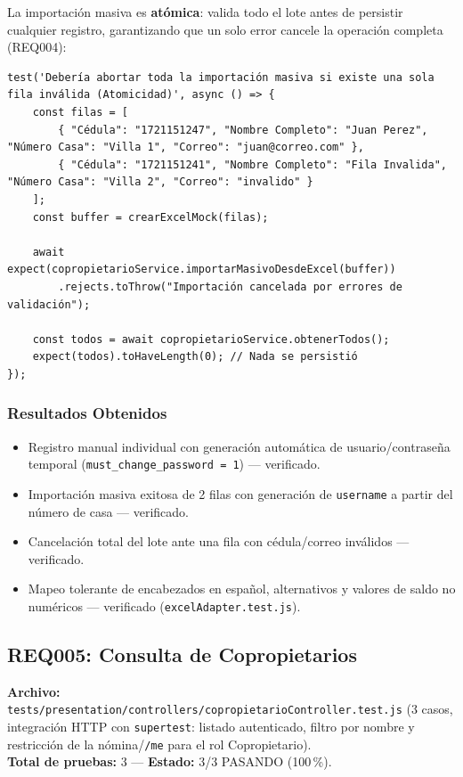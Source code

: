 \documentclass[12pt,a4paper]{article}
\begin{document}
La importación masiva es \textbf{atómica}: valida todo el lote antes de persistir cualquier
registro, garantizando que un solo error cancele la operación completa (REQ004):

\begin{lstlisting}[caption={Prueba de atomicidad de la importación masiva (\texttt{CopropietarioService.test.js})}]
test('Debería abortar toda la importación masiva si existe una sola fila inválida (Atomicidad)', async () => {
    const filas = [
        { "Cédula": "1721151247", "Nombre Completo": "Juan Perez", "Número Casa": "Villa 1", "Correo": "juan@correo.com" },
        { "Cédula": "1721151241", "Nombre Completo": "Fila Invalida", "Número Casa": "Villa 2", "Correo": "invalido" }
    ];
    const buffer = crearExcelMock(filas);

    await expect(copropietarioService.importarMasivoDesdeExcel(buffer))
        .rejects.toThrow("Importación cancelada por errores de validación");

    const todos = await copropietarioService.obtenerTodos();
    expect(todos).toHaveLength(0); // Nada se persistió
});
\end{lstlisting}

\subsubsection*{Resultados Obtenidos}
\begin{itemize}[nosep]
    \item Registro manual individual con generación automática de usuario/contraseña
    temporal (\texttt{must\_change\_password = 1}) — verificado.
    \item Importación masiva exitosa de 2 filas con generación de \texttt{username} a
    partir del número de casa — verificado.
    \item Cancelación total del lote ante una fila con cédula/correo inválidos — verificado.
    \item Mapeo tolerante de encabezados en español, alternativos y valores de saldo no
    numéricos — verificado (\texttt{excelAdapter.test.js}).
\end{itemize}

\subsection{REQ005: Consulta de Copropietarios}
\textbf{Archivo:} \texttt{tests/presentation/controllers/copropietarioController.test.js}
(3 casos, integración HTTP con \texttt{supertest}: listado autenticado, filtro por nombre y
restricción de la nómina/\texttt{/me} para el rol Copropietario).\\
\textbf{Total de pruebas:} 3 — \textbf{Estado:} 3/3 PASANDO (100\,\%).
\end{document}
